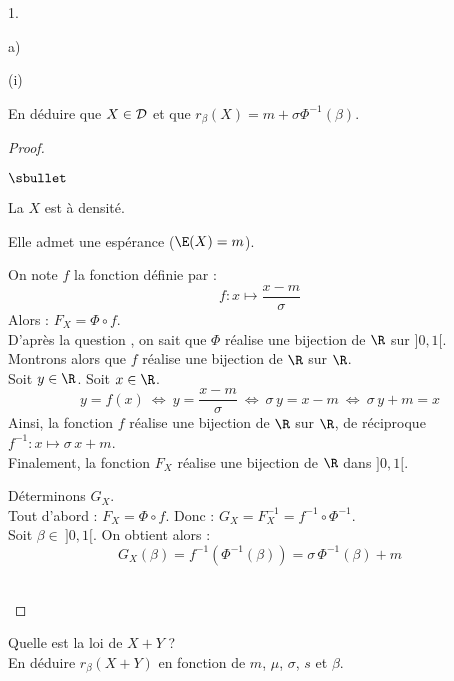 \begin{noliste}{1.}
\begin{noliste}{a)}
\begin{nonoliste}{(i)}
      
      \item En déduire que $X \in {\cal D}$ et que 
      $r_\beta(X)=m+\sigma \Phi^{-1}(\beta)$.
      
      \begin{proof}~
        \begin{noliste}{$\sbullet$}
	  \item La \var $X$ est à densité.
	  \item Elle admet une espérance ($\E(X)=m$).
	  \item On note $f$ la fonction définie par : 
	  \[
	    f : x \mapsto \dfrac{x-m}{\sigma}
	  \]
	  Alors : $F_X=\Phi \circ f$.\\
	  D'après la question , on sait que 
	  $\Phi$ réalise une bijection de $\R$ sur $]0,1[$.\\
	  Montrons alors que $f$ réalise une bijection de $\R$ sur 
	  $\R$.\\
	  Soit $y\in \R$. Soit $x\in\R$.
	  \[
	    y=f(x) \ \Leftrightarrow \ y = \dfrac{x-m}{\sigma}
	    \ \Leftrightarrow \ \sigma \, y = x-m \ 
	    \Leftrightarrow \ \sigma \, y+m = x
	  \]
	  Ainsi, la fonction $f$ réalise une bijection de $\R$ sur 
	  $\R$, de 
	  réciproque $f^{-1} : x \mapsto \sigma \, x+m$.\\
	  Finalement, la fonction $F_X$ réalise une bijection de 
	  $\R$ dans $]0,1[$.
	  
	  
	  
	  \newpage
	  
	  
	  
	  \item Déterminons $G_X$.\\
	  Tout d'abord : $F_X=\Phi \circ f$. Donc :
	  $G_X=F_X^{-1} = f^{-1} \circ \Phi^{-1}$.\\
	  Soit $\beta \in \ ]0,1[$. On obtient alors :
	  \[
	    G_X(\beta) = f^{-1}(\Phi^{-1}(\beta)) = \sigma \,
	    \Phi^{-1}(\beta) +m
	  \]
	  ~\\[-1.4cm]
        \end{noliste}
      \end{proof}
    \end{nonoliste}
    
    \item Quelle est la loi de $X+Y$ ?\\
    En déduire $r_\beta(X+Y)$ en fonction de $m$, $\mu$, $\sigma$, 
    $s$ et $\beta$.
    

\end{noliste}
\end{noliste}
